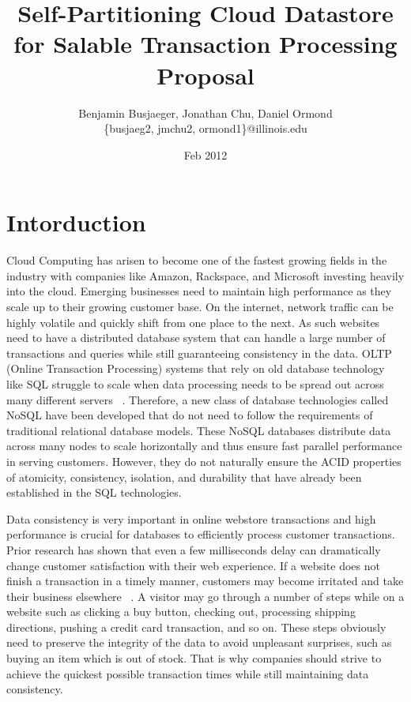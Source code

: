 \documentclass[10pt,final,journal]{IEEEtran}
\begin{document}
\title{Self-Partitioning Cloud Datastore for Salable Transaction Processing Proposal}
\author{Benjamin Busjaeger, Jonathan Chu, Daniel Ormond \\
\{busjaeg2, jmchu2, ormond1\}@illinois.edu}
\date{Feb 2012}
\maketitle



\section{Intorduction}
Cloud Computing has arisen to become one of the fastest growing fields in the industry with companies like Amazon, Rackspace, and Microsoft investing heavily into the cloud. Emerging businesses need to maintain high performance as they scale up to their growing customer base. On the internet, network traffic can be highly volatile and quickly shift from one place to the next. As such websites need to have a distributed database system that can handle a large number of transactions and queries while still guaranteeing consistency in the data. OLTP (Online Transaction Processing) systems that rely on old database technology like SQL struggle to scale when data processing needs to be spread out across many different servers ~\cite{Malkowski:2010:EAD:1774088.1774449}. Therefore, a new class of database technologies called NoSQL have been developed that do not need to follow the requirements of traditional relational database models. These NoSQL databases distribute data across many nodes to scale horizontally and thus ensure fast parallel performance in serving customers.  However, they do not naturally ensure the ACID properties of atomicity, consistency, isolation, and durability that have already been established in the SQL technologies.

Data consistency is very important in online webstore transactions and high performance is crucial for databases to efficiently process customer transactions. Prior research has shown that even a few milliseconds delay can dramatically change customer satisfaction with their web experience. If a website does not finish a transaction in a timely manner, customers may become irritated and take their business elsewhere ~\cite{Ramsay:1998}. A visitor may go through a number of steps while on a website such as clicking a buy button, checking out, processing shipping directions, pushing a credit card transaction, and so on. These steps obviously need to preserve the integrity of the data to avoid unpleasant surprises, such as buying an item which is out of stock. That is why companies should strive to achieve the quickest possible transaction times while still maintaining data consistency.
\end{document}
